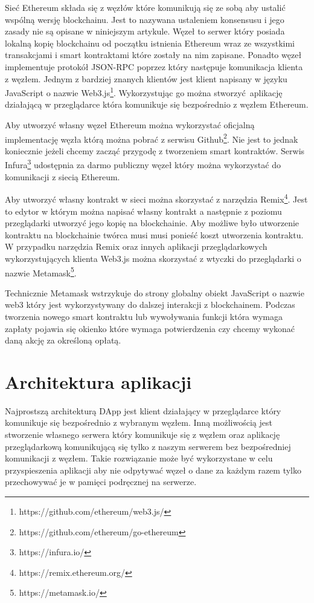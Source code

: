 \documentclass[]{llncs}
\begin{document}
  Sieć Ethereum\cite{ethereum-doc} składa się z węzłów które komunikują się ze
  sobą aby ustalić wspólną wersję blockchainu. Jest to nazywana ustaleniem
  konsensusu i jego zasady nie są opisane w niniejszym artykule. Węzeł to serwer
  który posiada lokalną kopię blockchainu od początku istnienia Ethereum wraz ze
  wszystkimi transakcjami i smart kontraktami które zostały na nim zapisane.
  Ponadto węzeł implementuje protokół JSON-RPC poprzez który następuje
  komunikacja klienta z węzłem. Jednym z bardziej znanych klientów jest klient
  napisany w języku JavaScript o nazwie
  Web3.js\footnote{https://github.com/ethereum/web3.js/}. Wykorzystując go można
  stworzyć aplikację działającą w przeglądarce która komunikuje się bezpośrednio
  z węzłem Ethereum.

  Aby utworzyć własny węzeł Ethereum można wykorzystać oficjalną implementację
  węzła którą można pobrać z serwisu
  Github\footnote{https://github.com/ethereum/go-ethereum}. Nie jest to jednak
  koniecznie jeżeli chcemy zacząć przygodę z tworzeniem smart kontraktów. Serwis
  Infura\footnote{https://infura.io/} udostępnia za darmo publiczny węzeł który
  można wykorzystać do komunikacji z siecią Ethereum.

  Aby utworzyć własny kontrakt w sieci można skorzystać z narzędzia
  Remix\footnote{https://remix.ethereum.org/}. Jest to edytor w którym można
  napisać własny kontrakt a następnie z poziomu przeglądarki utworzyć jego kopię
  na blockchainie. Aby możliwe było utworzenie kontraktu na blockchainie twórca
  musi musi ponieść koszt utworzenia kontraktu. W przypadku narzędzia Remix oraz
  innych aplikacji przeglądarkowych wykorzystujących klienta Web3.js można
  skorzystać z wtyczki do przeglądarki o nazwie
  Metamask\footnote{https://metamask.io/}.

  Technicznie Metamask wstrzykuje do strony globalny obiekt JavaScript o nazwie
  web3 który jest wykorzystywany do dalszej interakcji z blockchainem. Podczas
  tworzenia nowego smart kontraktu lub wywoływania funkcji która wymaga zapłaty
  pojawia się okienko które wymaga potwierdzenia czy chcemy wykonać daną akcję
  za określoną opłatą.

\section{Architektura aplikacji}

  Najprostszą architekturą DApp jest klient działający w przeglądarce który
  komunikuje się bezpośrednio z wybranym węzłem. Inną możliwością jest
  stworzenie własnego serwera który komunikuje się z węzłem oraz aplikację
  przeglądarkową komunikującą się tylko z naszym serwerem bez bezpośredniej
  komunikacji z węzłem. Takie rozwiązanie może być wykorzystane w celu
  przyspieszenia aplikacji aby nie odpytywać węzeł o dane za każdym razem tylko
  przechowywać je w pamięci podręcznej na serwerze.
\end{document}
